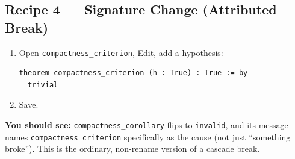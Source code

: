 \documentclass[11pt]{article}
\newcommand{\code}[1]{\texttt{#1}}
\newcommand{\see}[1]{\textbf{You should see:} #1}
\begin{document}
\subsection*{Recipe 4 --- Signature Change (Attributed Break)}
\begin{enumerate}[label=\arabic*.]
  \item Open \code{compactness\_criterion}, Edit, add a hypothesis:
\begin{verbatim}
theorem compactness_criterion (h : True) : True := by
  trivial
\end{verbatim}
  \item Save.
\end{enumerate}
\see{\code{compactness\_corollary} flips to \code{invalid}, and its message
names \code{compactness\_criterion} specifically as the cause (not just
``something broke''). This is the ordinary, non-rename version of a cascade
break.}
\end{document}
